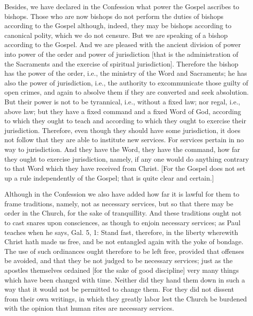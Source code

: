 Besides, we have declared in the Confession what power the Gospel
ascribes to bishops.  Those who are now bishops do not perform the
duties of bishops according to the Gospel although, indeed, they may
be bishops according to canonical polity, which we do not censure.
But we are speaking of a bishop according to the Gospel.  And we are
pleased with the ancient division of power into power of the order
and power of jurisdiction [that is the administration of the
Sacraments and the exercise of spiritual jurisdiction].  Therefore
the bishop has the power of the order, i.e., the ministry of the Word
and Sacraments; he has also the power of jurisdiction, i.e., the
authority to excommunicate those guilty of open crimes, and again to
absolve them if they are converted and seek absolution.  But their
power is not to be tyrannical, i.e., without a fixed law; nor regal,
i.e., above law; but they have a fixed command and a fixed Word of
God, according to which they ought to teach and according to which
they ought to exercise their jurisdiction.  Therefore, even though
they should have some jurisdiction, it does not follow that they are
able to institute new services.  For services pertain in no way to
jurisdiction.  And they have the Word, they have the command, how far
they ought to exercise jurisdiction, namely, if any one would do
anything contrary to that Word which they have received from Christ.
[For the Gospel does not set up a rule independently of the Gospel;
that is quite clear and certain.]

Although in the Confession we also have added how far it is lawful
for them to frame traditions, namely, not as necessary services, but
so that there may be order in the Church, for the sake of
tranquillity.  And these traditions ought not to cast snares upon
consciences, as though to enjoin necessary services; as Paul teaches
when he says, Gal. 5, 1: Stand fast, therefore, in the liberty
wherewith Christ hath made us free, and be not entangled again with
the yoke of bondage.  The use of such ordinances ought therefore to
be left free, provided that offenses be avoided, and that they be not
judged to be necessary services; just as the apostles themselves
ordained [for the sake of good discipline] very many things which
have been changed with time.  Neither did they hand them down in such
a way that it would not be permitted to change them.  For they did
not dissent from their own writings, in which they greatly labor lest
the Church be burdened with the opinion that human rites are
necessary services.

